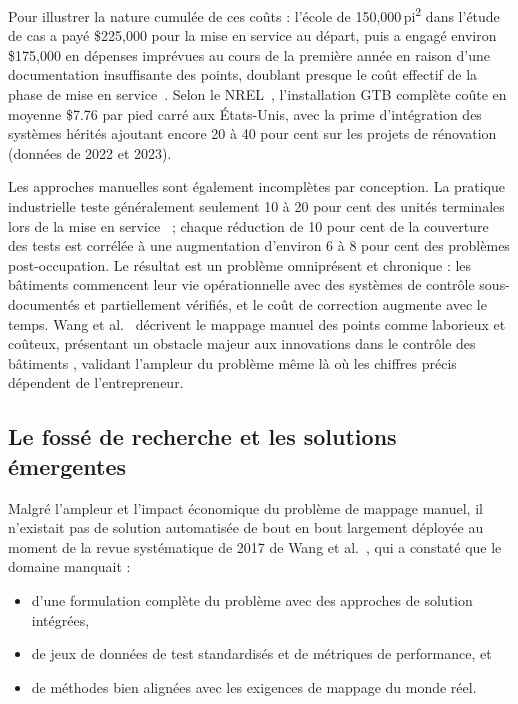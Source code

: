 Pour illustrer la nature cumulée de ces coûts : l'école de 150{,}000\,pi\textsuperscript{2} dans l'étude de cas
a payé \$225{,}000 pour la mise en service au départ, puis a engagé environ \$175{,}000 en dépenses imprévues
au cours de la première année en raison d'une documentation insuffisante des points, doublant presque le coût effectif de la
phase de mise en service~\cite{PingCx2024}.
Selon le NREL~\cite{Trenbath2022}, l'installation GTB complète coûte en moyenne \$7.76 par pied carré
aux États-Unis, avec la prime d'intégration des systèmes hérités ajoutant encore 20 à 40
pour cent sur les projets de rénovation~\cite{Envigilance2023} (données de 2022 et 2023).

Les approches manuelles sont également incomplètes par conception.
La pratique industrielle teste généralement seulement 10 à 20 pour cent des unités terminales lors de la mise en service~\cite{PingCx2024} ;
chaque réduction de 10 pour cent de la couverture des tests est corrélée à une augmentation d'environ 6 à 8 pour cent
des problèmes post-occupation.
Le résultat est un problème omniprésent et chronique : les bâtiments commencent leur vie opérationnelle avec
des systèmes de contrôle sous-documentés et partiellement vérifiés, et le coût de correction augmente avec le temps.
Wang et al.~\cite{Wang2017} décrivent le mappage manuel des points comme \og laborieux et coûteux, présentant
un obstacle majeur aux innovations dans le contrôle des bâtiments \fg{}, validant l'ampleur du problème même
là où les chiffres précis dépendent de l'entrepreneur.

\subsection{Le fossé de recherche et les solutions émergentes}
\label{subsec:research-gap}

Malgré l'ampleur et l'impact économique du problème de mappage manuel, il n'existait pas de solution automatisée
de bout en bout largement déployée au moment de la revue systématique de 2017 de Wang et al.~\cite{Wang2017}, qui a constaté
que le domaine manquait :
\begin{itemize}[leftmargin=*, itemsep=2pt]
  \item d'une formulation complète du problème avec des approches de solution intégrées,
  \item de jeux de données de test standardisés et de métriques de performance, et
  \item de méthodes bien alignées avec les exigences de mappage du monde réel.
\end{itemize}

